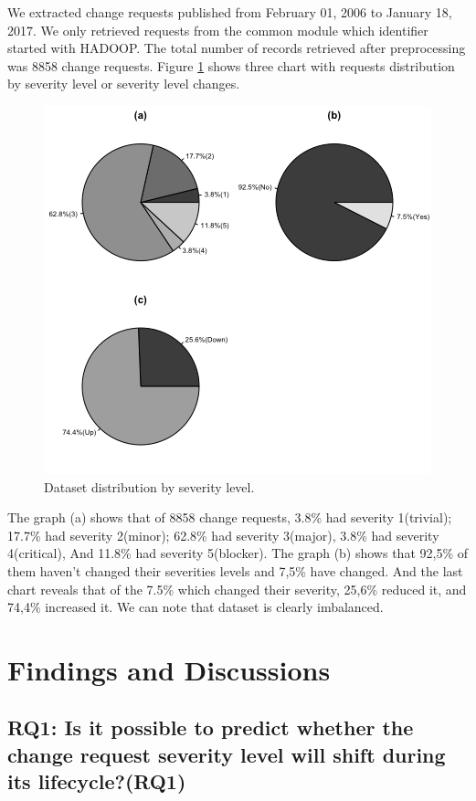 \documentclass[10pt, conference]{IEEEtran}
\begin{document}
We extracted change requests published from February 01, 2006 to January 18, 2017.  We only retrieved requests from the common module which identifier started with HADOOP. The total number of records retrieved after preprocessing was 8858 change requests. Figure \ref{fig:ds_distribution} shows three chart with requests distribution by severity level or severity level changes.


\begin{figure}[!hbt]
  \label{fig:ds_distribution}
  \includegraphics[scale=0.60]{figures/ds_distribution.png}
  \caption{Dataset distribution by severity level.}
\end{figure}


The graph (a) shows that of 8858 change requests, 3.8\% had severity 1(trivial); 17.7\% had severity 2(minor); 62.8\% had severity 3(major), 3.8\% had severity 4(critical), And 11.8\% had severity 5(blocker). The graph (b) shows that 92,5\% of them haven't changed their severities levels and 7,5\% have changed. And the last chart reveals that of the 7.5\% which changed their severity, 25,6\% reduced it, and 74,4\% increased it. We can note that dataset is clearly imbalanced.

\section{Findings and Discussions}

\subsection{RQ1: Is it possible to predict whether the change request severity level will shift during its lifecycle?(RQ1)}
\end{document}
